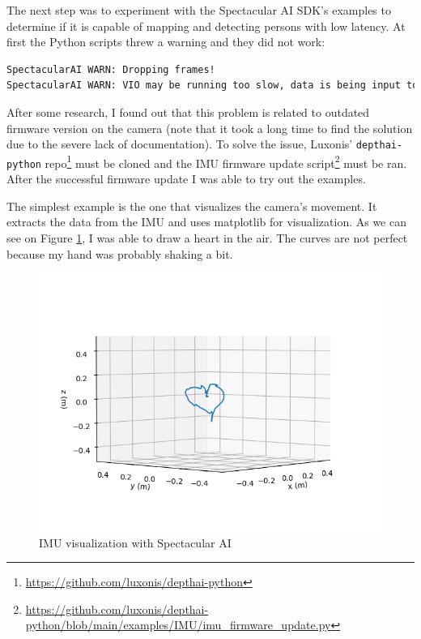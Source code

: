 The next step was to experiment with the Spectacular AI SDK's examples to determine if it is capable of mapping and detecting persons with low latency. At first the Python scripts threw a warning and they did not work: 
\FloatBarrier
\begin{lstlisting}[language=bash,frame=single,float=h]
SpectacularAI WARN: Dropping frames!
SpectacularAI WARN: VIO may be running too slow, data is being input too fast, or IMU samples are missing / time-offset from frames. (buffer size 10)
\end{lstlisting}
After some research, I found out that this problem is related to outdated firmware version on the camera (note that it took a long time to find the solution due to the severe lack of documentation). To solve the issue, Luxonis' \verb|depthai-python| repo\footnote{\url{https://github.com/luxonis/depthai-python}} must be cloned and the IMU firmware update script\footnote{\url{https://github.com/luxonis/depthai-python/blob/main/examples/IMU/imu_firmware_update.py}} must be ran. After the successful firmware update I was able to try out the examples.

The simplest example is the one that visualizes the camera's movement. It extracts the data from the IMU and uses matplotlib for visualization. As we can see on Figure \ref{fig:IMU_visu}, I was able to draw a heart in the air. The curves are not perfect because my hand was probably shaking a bit.

\begin{figure}[htbp]
	\centering
	\includegraphics[width=150mm, keepaspectratio]{figures/spectacular_ai_vio_visu.png}
	\caption{IMU visualization with Spectacular AI}
	\label{fig:IMU_visu}
\end{figure}

